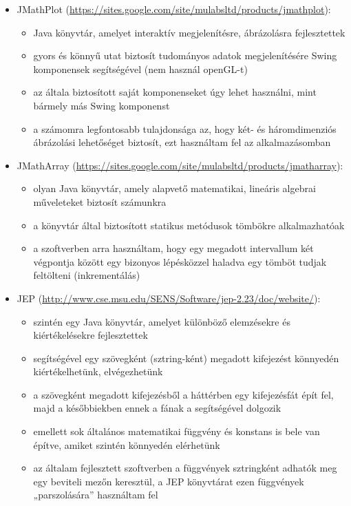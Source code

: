 	\begin{itemize}
		\item JMathPlot (\url{https://sites.google.com/site/mulabsltd/products/jmathplot}):
		\begin{itemize}
			\item Java könyvtár, amelyet interaktív megjelenítésre, ábrázolásra fejlesztettek
			\item gyors és könnyű utat biztosít tudományos adatok megjelenítésére Swing komponensek segítségével (nem használ openGL-t)
			\item az általa biztosított saját komponenseket úgy lehet használni, mint bármely más Swing komponenst
			\item a számomra legfontosabb tulajdonsága az, hogy két- és háromdimenziós ábrázolási lehetőséget biztosít, ezt használtam fel az alkalmazásomban
		\end{itemize}
		\item JMathArray (\url{https://sites.google.com/site/mulabsltd/products/jmatharray}):
		\begin{itemize}
			\item olyan Java könyvtár, amely alapvető matematikai, lineáris algebrai műveleteket biztosít számunkra 
			\item a könyvtár által biztosított statikus metódusok tömbökre alkalmazhatóak
			\item a szoftverben arra használtam, hogy egy megadott intervallum két végpontja között egy bizonyos lépésközzel haladva egy tömböt tudjak feltölteni (inkrementálás)
		\end{itemize}
		\item JEP (\url{http://www.cse.msu.edu/SENS/Software/jep-2.23/doc/website/}):
		\begin{itemize}
			\item szintén egy Java könyvtár, amelyet különböző elemzésekre és kiértékelésekre fejlesztettek
			\item segítségével egy szövegként (sztring-ként) megadott kifejezést könnyedén kiértékelhetünk, elvégezhetünk
			\item a szövegként megadott kifejezésből a háttérben egy kifejezésfát épít fel, majd a későbbiekben ennek a fának a segítségével dolgozik
			\item emellett sok általános matematikai függvény és konstans is bele van építve, amiket szintén könnyedén elérhetünk
			\item az általam fejlesztett szoftverben a függvények sztringként adhatók meg egy beviteli mezőn keresztül, a JEP könyvtárat ezen függvények „parszolására” használtam fel
		\end{itemize}
	\end{itemize}

